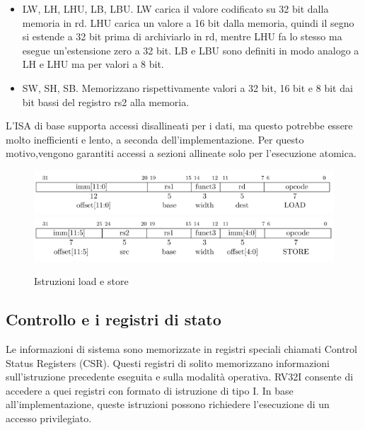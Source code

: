 \documentclass[12pt,a4paper]{report}
\begin{document}
\begin{itemize}
	\item LW, LH, LHU, LB, LBU. LW carica il valore codificato su 32 bit dalla memoria in rd. LHU 
carica un valore a 16 bit dalla memoria, quindi il segno si estende a 32 bit prima di archiviarlo in rd, mentre LHU fa lo stesso ma esegue un'estensione zero a 32 bit. LB e LBU sono definiti in modo analogo a LH e LHU ma per valori a 8 bit.
	\item SW, SH, SB. Memorizzano rispettivamente valori a 32 bit, 16 bit e 8 bit dai bit bassi del registro rs2 alla memoria.
\end{itemize}

L'ISA di base supporta accessi disallineati per i dati, ma questo potrebbe essere molto inefficienti e lento, a seconda dell'implementazione. Per questo motivo,vengono garantiti accessi a sezioni allineate solo per l'esecuzione atomica.

\begin{figure}
	\includegraphics[width = \textwidth]{Istruzioni/Istruction7.png}
	\includegraphics[width = \textwidth]{Istruzioni/Istruction8.png}
	\caption{Istruzioni load e store}
	\label{Fig:Istruzioni_LS}
\end{figure}

\subsection{Controllo e i registri di stato}
Le informazioni di sistema sono memorizzate in registri speciali chiamati Control Status Registers (CSR). Questi registri di solito memorizzano informazioni sull'istruzione precedente eseguita e sulla modalità operativa. RV32I consente di accedere a quei registri con formato di istruzione di tipo I. In base all'implementazione, queste istruzioni possono richiedere l'esecuzione di un accesso privilegiato.
\end{document}
